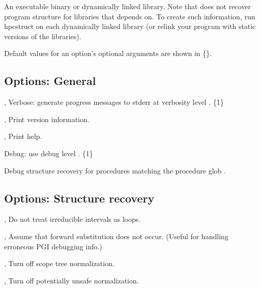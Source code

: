 \documentclass[english]{article}
\begin{document}
\begin{Description}
\item[\Arg{binary}] An executable binary or dynamically linked library.
Note that  does not recover program structure for libraries that  depends on.  To create such information, run hpcstruct on each dynamically linked library (or relink your program with static versions of the libraries).
\end{Description}

Default values for an option's optional arguments are shown in \{\}.

\subsection{Options: General}

\begin{Description}
\item[\OptoArg{-v}{n}, \OptoArg{--verbose}{n}]
Verbose: generate progress messages to stderr at verbosity level .  \{1\}

\item[\Opt{-V}, \Opt{--version}]
Print version information.

\item[\Opt{-h}, \Opt{--help}]
Print help.

\item[\OptoArg{--debug}{n}]
Debug: use debug level . \{1\}

\item[\OptArg{--debug-proc}{glob}]
Debug structure recovery for procedures matching the procedure glob .
\end{Description}


\subsection{Options: Structure recovery}

\begin{Description}
\item[\Opt{-i}, \Opt{--irreducible-interval-as-loop-off}]
Do not treat irreducible intervals as loops.

\item[\Opt{-f}, \Opt{--forward-substitution-off}]
Assume that forward substitution does not occur.  (Useful for handling erroneous PGI debugging info.)

\item[\Opt{-n}, \Opt{--normalize-off}]
Turn off scope tree normalization.

\item[\Opt{-u}, \Opt{--unsafe-normalize-off}]
Turn off potentially unsafe normalization.
\end{Description}
\end{document}
